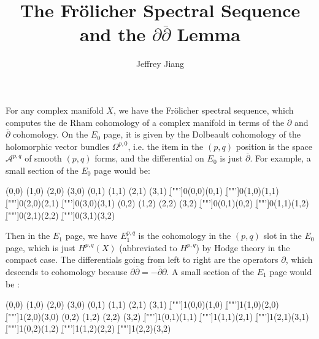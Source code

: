 \documentclass[psamsfonts, 12pt]{amsart}
\theoremstyle{definition}
\theoremstyle{remark}
\newcommand{\dbar}{\overline{\partial}}
\begin{document}
%
\author{Jeffrey Jiang}
%
\title{The Fr\"olicher Spectral Sequence and the $\partial\dbar$ Lemma}
%
\setcounter{section}{1}
%
\maketitle
%
For any complex manifold $X$, we have the Fr\"olicher spectral sequence, which
computes the de Rham cohomology of a complex manifold in terms of the
$\partial$ and $\dbar$ cohomology. On the $E_0$ page, it is given
by the Dolbeault cohomology of the holomorphic vector bundles $\Omega^{p,0}$, i.e.
the item in the $(p,q)$ position is the space $\mathcal{A}^{p,q}$ of smooth $(p,q)$
forms, and the differential on $E_0$ is just $\dbar$. For example, a small section of
the $E_0$ page would be: \\
%
\begin{sseqdata}[name=Frolicher0, classes = {draw = none}, yscale=2, xscale=2]
\class["\mathcal{A}^{0,0}"](0,0)
\class["\mathcal{A}^{1,0}"](1,0)
\class["\mathcal{A}^{2,0}"](2,0)
\class["\mathcal{A}^{3,0}"](3,0)
\class["\mathcal{A}^{0,1}"](0,1)
%
\class["\mathcal{A}^{1,1}"](1,1)
\class["\mathcal{A}^{2,1}"](2,1)
\class["\mathcal{A}^{3,1}"](3,1)
\d["\dbar"']0(0,0)(0,1)
\d["\dbar"']0(1,0)(1,1)
\d["\dbar"']0(2,0)(2,1)
\d["\dbar"']0(3,0)(3,1)
%
\class["\mathcal{A}^{0,2}"](0,2)
\class["\mathcal{A}^{1,2}"](1,2)
\class["\mathcal{A}^{2,2}"](2,2)
\class["\mathcal{A}^{3,2}"](3,2)
\d["\dbar"']0(0,1)(0,2)
\d["\dbar"']0(1,1)(1,2)
\d["\dbar"']0(2,1)(2,2)
\d["\dbar"']0(3,1)(3,2)
\end{sseqdata}
\begin{center}
\printpage[name=Frolicher0, page = 0]
\end{center}
%
Then in the $E_1$ page, we have $E_1^{p,q}$ is the cohomology in the $(p,q)$ slot
in the $E_0$ page, which is just $H^{p,q}(X)$ (abbreviated to $H^{p,q}$) by Hodge
theory in the compact case. The differentials going from left to right are the
operators $\partial$, which descends to cohomology because
$\partial\dbar = -\dbar\partial$. A small section of the $E_1$ page would be : \\
%
\begin{sseqdata}[name=Frolicher1, classes = {draw = none}, yscale=2, xscale=2]
\class["H^{0,0}"](0,0)
\class["H^{1,0}"](1,0)
\class["H^{2,0}"](2,0)
\class["H^{3,0}"](3,0)
\class["H^{0,1}"](0,1)
%
\class["H^{1,1}"](1,1)
\class["H^{2,1}"](2,1)
\class["H^{3,1}"](3,1)
\d["\partial"']1(0,0)(1,0)
\d["\partial"']1(1,0)(2,0)
\d["\partial"']1(2,0)(3,0)
%
\class["H^{0,2}"](0,2)
\class["H^{1,2}"](1,2)
\class["H^{2,2}"](2,2)
\class["H^{3,2}"](3,2)
\d["\partial"']1(0,1)(1,1)
\d["\partial"']1(1,1)(2,1)
\d["\partial"']1(2,1)(3,1)
%
\d["\partial"']1(0,2)(1,2)
\d["\partial"']1(1,2)(2,2)
\d["\partial"']1(2,2)(3,2)
\end{sseqdata}
\end{document}
